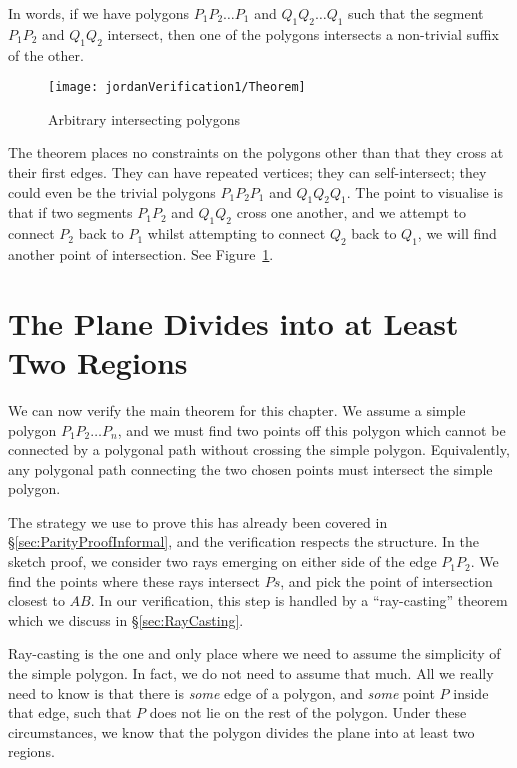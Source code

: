 In words, if we have polygons $P_1P_2\ldots P_1$ and $Q_1Q_2\ldots Q_1$ such that the segment $P_1P_2$ and $Q_1Q_2$ intersect, then one of the polygons intersects a non-trivial suffix of the other.

\begin{figure}
\centering\texttt{[image: jordanVerification1/Theorem]}
\caption{Arbitrary intersecting polygons}
\label{fig:IntersectingPolygons}
\end{figure}

The theorem places no constraints on the polygons other than that they cross at their first edges. They can have repeated vertices; they can self-intersect; they could even be the trivial polygons $P_1P_2P_1$ and $Q_1Q_2Q_1$. The point to visualise is that if two segments $P_1P_2$ and $Q_1Q_2$ cross one another, and we attempt to connect $P_2$ back to $P_1$ whilst attempting to connect $Q_2$ back to $Q_1$, we will find another point of intersection. See Figure~\ref{fig:IntersectingPolygons}.

\section{The Plane Divides into at Least Two Regions}\label{sec:FinalProofJordan1}
We can now verify the main theorem for this chapter. We assume a simple polygon $P_1P_2\ldots P_n$, and we must find two points off this polygon which cannot be connected by a polygonal path without crossing the simple polygon. Equivalently, any polygonal path connecting the two chosen points must intersect the simple polygon.

The strategy we use to prove this has already been covered in \S\ref{sec:ParityProofInformal}, and the verification respects the structure. In the sketch proof, we consider two rays emerging on either side of the edge $P_1P_2$. We find the points where these rays intersect $Ps$, and pick the point of intersection closest to $AB$. In our verification, this step is handled by a ``ray-casting'' theorem which we discuss in \S\ref{sec:RayCasting}. 

Ray-casting is the one and only place where we need to assume the simplicity of the simple polygon. In fact, we do not need to assume that much. All we really need to know is that there is \emph{some} edge of a polygon, and \emph{some} point $P$ inside that edge, such that $P$ does not lie on the rest of the polygon. Under these circumstances, we know that the polygon divides the plane into at least two regions.

